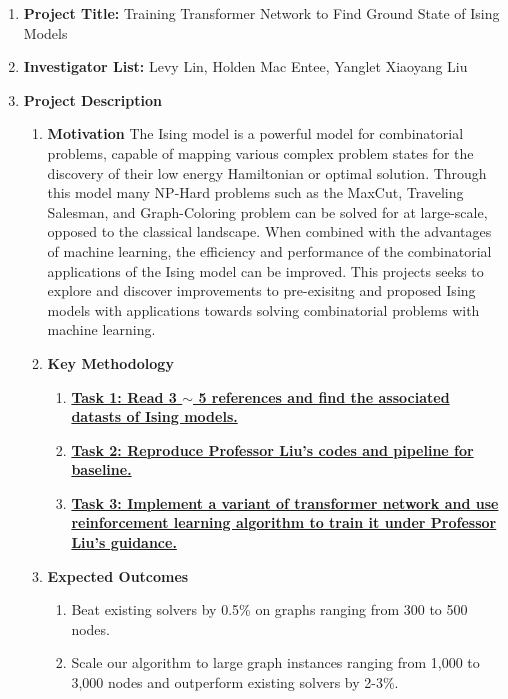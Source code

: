 \documentclass{article}
\begin{document}
\begin{enumerate}
\item \textbf{Project Title:} Training Transformer Network to Find Ground State of Ising Models

\item \textbf{Investigator List:} Levy Lin, Holden Mac Entee, Yanglet Xiaoyang Liu

\item \textbf{Project Description}
\begin{enumerate}
	\item \textbf{Motivation}
	\newline
	The Ising model is a powerful model for combinatorial problems, capable of mapping various complex problem states for the discovery of their low energy Hamiltonian or optimal solution. Through this model many NP-Hard problems such as the MaxCut, Traveling Salesman, and Graph-Coloring problem can be solved for at large-scale, opposed to the classical landscape. When combined with the advantages of machine learning, the efficiency and performance of the combinatorial applications of the Ising model can be improved. This projects seeks to explore and discover improvements to pre-exisitng and proposed Ising models with applications towards solving combinatorial problems with machine learning. 

	\item \textbf{Key Methodology}
		
	\begin{enumerate}
			
		\item \textbf{\underline{Task 1: Read 3 $\sim$ 5 references and find the associated datasts of Ising models.}} 
		\item \textbf{\underline{Task 2: Reproduce Professor Liu's codes and pipeline for baseline.}} 

		\item \textbf{\underline{Task 3: Implement a variant of transformer network and use reinforcement learning algorithm to train it under Professor Liu's guidance.}} 

	\end{enumerate}

	\item \textbf{Expected Outcomes}
	
	\begin{enumerate}
		\item Beat existing solvers by 0.5\% on graphs ranging from 300 to 500 nodes.
		\item Scale our algorithm to large graph instances ranging from 1,000 to 3,000 nodes and outperform existing solvers by 2-3\%.
	\end{enumerate}


\end{enumerate}
\end{enumerate}
\end{document}
